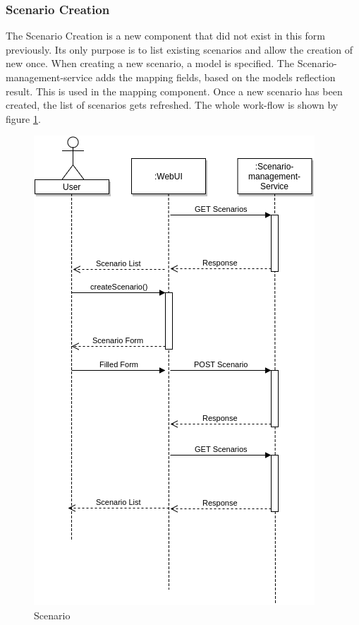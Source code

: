 \subsubsection{Scenario Creation}
The Scenario Creation is a new component that did not exist in this form previously. Its only purpose is to list existing scenarios and allow the creation of new once. When creating a new scenario, a model is specified. The Scenario-management-service adds the mapping fields, based on the models reflection result. This is used in the mapping component. Once a new scenario has been created, the list of scenarios gets refreshed. The whole work-flow is shown by figure \ref{fig:scenario}.
\begin{figure}[H]
	\centering\includegraphics[width=.60\textwidth]{res/Scenario}
	\caption{Scenario}
	\label{fig:scenario}
\end{figure}

